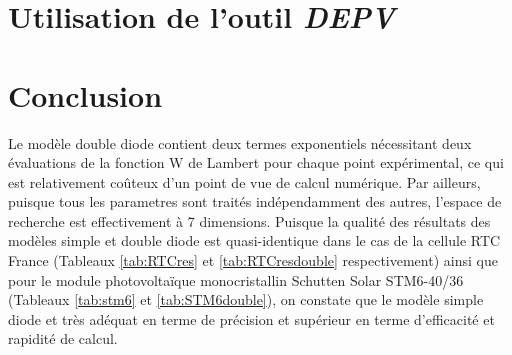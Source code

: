 \section{Utilisation de l'outil \textit{DEPV}}

\section{Conclusion}

Le modèle double diode contient deux termes exponentiels nécessitant deux évaluations de la fonction W de Lambert pour chaque point expérimental, ce qui est relativement coûteux d'un point de vue de calcul numérique. Par ailleurs, puisque tous les parametres sont traités indépendamment des autres, l'espace de recherche est effectivement à 7 dimensions. Puisque la qualité des résultats des modèles simple et double diode est quasi-identique dans le cas de la cellule RTC France (Tableaux \ref{tab:RTCres} et \ref{tab:RTCresdouble} respectivement) ainsi que pour le module photovoltaïque monocristallin Schutten Solar STM6-40/36 (Tableaux \ref{tab:stm6} et \ref{tab:STM6double}), on constate que le modèle simple diode et très adéquat en terme de précision et supérieur en terme d'efficacité et rapidité de calcul.
